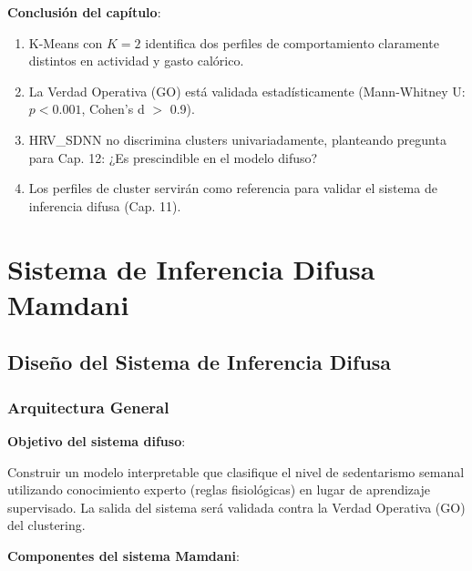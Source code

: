 \documentclass[12pt,letterpaper,twoside]{report}
\begin{document}
\begin{calculobox}
\begin{conclusionbox}
\textbf{Conclusión del capítulo}:

\begin{enumerate}[noitemsep]
    \item K-Means con $K=2$ identifica dos perfiles de comportamiento claramente distintos en actividad y gasto calórico.
    \item La Verdad Operativa (GO) está validada estadísticamente (Mann-Whitney U: $p<0.001$, Cohen's d $>$ 0.9).
    \item HRV\_SDNN no discrimina clusters univariadamente, planteando pregunta para Cap. 12: ¿Es prescindible en el modelo difuso?
    \item Los perfiles de cluster servirán como referencia para validar el sistema de inferencia difusa (Cap. 11).
\end{enumerate}
\end{conclusionbox}

\chapter{Sistema de Inferencia Difusa Mamdani}

\section{Diseño del Sistema de Inferencia Difusa}

\subsection{Arquitectura General}

\begin{hipotesisbox}
\textbf{Objetivo del sistema difuso}:

Construir un modelo interpretable que clasifique el nivel de sedentarismo semanal utilizando conocimiento experto (reglas fisiológicas) en lugar de aprendizaje supervisado. La salida del sistema será validada contra la Verdad Operativa (GO) del clustering.
\end{hipotesisbox}

\begin{estadisticobox}
\textbf{Componentes del sistema Mamdani}:


\end{estadisticobox}
\end{calculobox}
\end{document}
